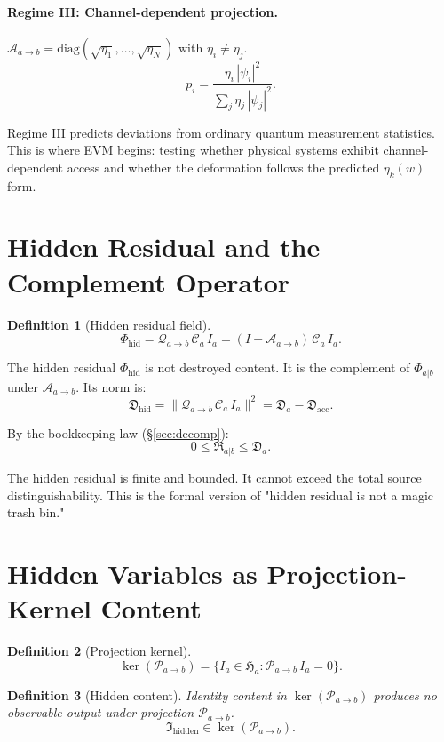 \documentclass[11pt,a4paper,oneside]{article}
\newtheorem{definition}{Definition}[section]
\newcommand{\Ia}{I_a}
\newcommand{\Ihid}{\mathfrak{I}_{\mathrm{hidden}}}
\newcommand{\Ha}{\mathfrak{H}_a}
\newcommand{\Pab}{\mathcal{P}_{a\to b}}
\newcommand{\Ca}{\mathcal{C}_a}
\newcommand{\Aab}{\mathcal{A}_{a\to b}}
\newcommand{\Qab}{\mathcal{Q}_{a\to b}}
\newcommand{\PhiAb}{\Phi_{a|b}}         %
\newcommand{\PhiHid}{\Phi_{\mathrm{hid}}}  %
\newcommand{\Da}{\mathfrak{D}_a}
\newcommand{\Dhid}{\mathfrak{D}_{\mathrm{hid}}}
\newcommand{\Dacc}{\mathfrak{D}_{\mathrm{acc}}}
\newcommand{\Rhid}{\mathfrak{R}_{a|b}}
\begin{document}
\paragraph{Regime III: Channel-dependent projection.}
$\Aab = \mathrm{diag}(\sqrt{\eta_1},\ldots,\sqrt{\eta_N})$ with $\eta_i \neq \eta_j$.
\[
p_i = \frac{\eta_i\,|\psi_i|^2}{\sum_j \eta_j\,|\psi_j|^2}.
\]

Regime III predicts deviations from ordinary quantum measurement statistics. This is where EVM begins: testing whether physical systems exhibit channel-dependent access and whether the deformation follows the predicted $\eta_k(w)$ form.

\section{Hidden Residual and the Complement Operator}

\begin{definition}[Hidden residual field]
\[
\PhiHid = \Qab\,\Ca\,\Ia = (I - \Aab)\,\Ca\,\Ia.
\]
\end{definition}

The hidden residual $\PhiHid$ is not destroyed content. It is the complement of $\PhiAb$ under $\Aab$. Its norm is:
\[
\Dhid = \|\Qab\,\Ca\,\Ia\|^2 = \Da - \Dacc.
\]

By the bookkeeping law (\S\ref{sec:decomp}):
\[
0 \leq \Rhid \leq \Da.
\]

The hidden residual is finite and bounded. It cannot exceed the total source distinguishability. This is the formal version of "hidden residual is not a magic trash bin."

\label{sec:decomp}

\section{Hidden Variables as Projection-Kernel Content}

\begin{definition}[Projection kernel]
\[
\ker(\Pab) = \{\Ia \in \Ha : \Pab\,\Ia = 0\}.
\]
\end{definition}

\begin{definition}[Hidden content]
Identity content in $\ker(\Pab)$ produces no observable output under projection $\Pab$.
\[
\Ihid \in \ker(\Pab).
\]
\end{definition}
\end{document}
